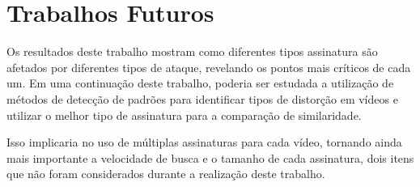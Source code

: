 \section{Trabalhos Futuros}
\label{sec:trabalhosFuturos}

Os resultados deste trabalho mostram como diferentes tipos assinatura são afetados por diferentes tipos de ataque, revelando os pontos mais críticos de cada um. Em uma continuação deste trabalho, poderia ser estudada a utilização de métodos de detecção de padrões para identificar tipos de distorção em vídeos e utilizar o melhor tipo de assinatura para a comparação de similaridade.

Isso implicaria no uso de múltiplas assinaturas para cada vídeo, tornando ainda mais importante a velocidade de busca e o tamanho de cada assinatura, dois itens que não foram considerados durante a realização deste trabalho. 